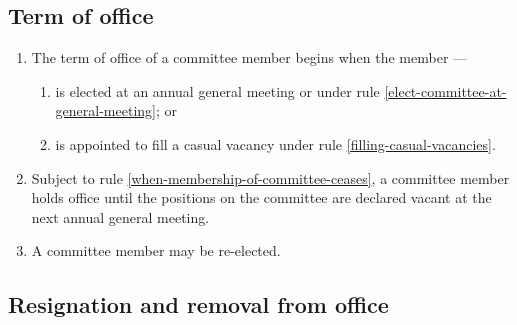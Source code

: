 \documentclass[../constitution.tex]{subfiles}
\begin{document}
\hypertarget{term-of-office}{%
  \subsection{Term of office}\label{term-of-office}}

\begin{enumerate}

  \item The term of office of a committee member begins when the member ---

        \begin{enumerate}

          \item is elected at an annual general meeting or under rule \ref{elect-committee-at-general-meeting}; or
          \item is appointed to fill a casual vacancy under rule \ref{filling-casual-vacancies}.
        \end{enumerate}
  \item Subject to rule \ref{when-membership-of-committee-ceases}, a committee member holds office until the positions on the committee are declared vacant at the next annual general meeting.
  \item A committee member may be re-elected.
\end{enumerate}

\hypertarget{resignation-and-removal-from-office}{%
  \subsection{Resignation and removal from office}\label{resignation-and-removal-from-office}}
\end{document}
